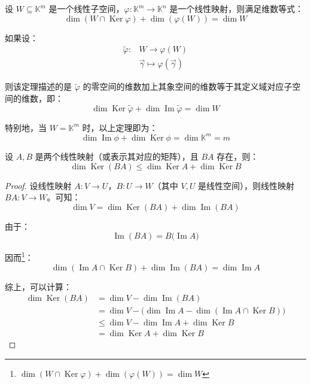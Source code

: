 \begin{theorem}
	设 $W \subseteq \mathbb K^m$ 是一个线性子空间，$\varphi \colon \mathbb K^m \to \mathbb K^n$ 是一个线性映射，则满足维数等式：
	$$
	\dim (W \cap \operatorname{Ker} \varphi) + \dim (\varphi(W)) = \dim W
	$$

	如果设：
	$$
	\begin{aligned} \tilde \varphi \colon & W \to \varphi(W) \\ & \vec \gamma \mapsto \varphi(\vec \gamma) \end{aligned}
	$$

	则该定理描述的是 $\tilde \varphi$ 的零空间的维数加上其象空间的维数等于其定义域对应子空间的维数，即：
	$$
	\dim \operatorname{Ker} \tilde \varphi + \dim \operatorname{Im} \tilde \varphi = \dim W
	$$
\end{theorem}

特别地，当 $W = \mathbb K^m$ 时，以上定理即为：
$$
\dim \operatorname{Im} \phi + \dim \operatorname{Ker} \phi = \dim \mathbb K^m = m
$$


\begin{theorem}
	设 $A, B$ 是两个线性映射（或表示其对应的矩阵），且 $BA$ 存在，则：
	$$
	\dim \operatorname{Ker}(BA) \le \dim \operatorname{Ker} A + \dim \operatorname{Ker} B
	$$
\end{theorem}

\begin{proof}
	设线性映射 $A \colon V \to U$，$B \colon U \to W$（其中 $V, U$ 是线性空间），则线性映射 $BA \colon V \to W$。可知：
	$$
	\dim V = \dim \operatorname{Ker}(BA) + \dim \operatorname{Im}(BA)
	$$

	由于：
	$$
	\operatorname{Im} (BA) = B \bigl( \operatorname{Im} A \bigr)
	$$

	因而\footnote{$\dim (W \cap \operatorname{Ker} \varphi) + \dim (\varphi(W)) = \dim W$}：
	$$
	\dim (\operatorname{Im} A \cap \operatorname{Ker} B) + \dim \operatorname{Im}(BA) = \dim \operatorname{Im} A
	$$

	综上，可以计算：
	$$
	\begin{aligned}
		\dim \operatorname{Ker}(BA) &= \dim V - \dim \operatorname{Im}(BA)
		\\&=
		\dim V - \bigl( \dim \operatorname{Im} A - \dim (\operatorname{Im} A \cap \operatorname{Ker} B) \bigr)
		\\&\le
		\dim V - \dim \operatorname{Im} A + \dim \operatorname{Ker} B
		\\&=
		\dim \operatorname{Ker} A + \dim \operatorname{Ker} B
	\end{aligned}
	$$
\end{proof}


